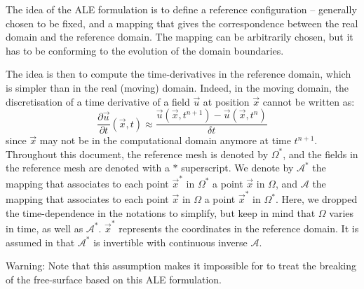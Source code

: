 The idea of the ALE formulation is to define a reference configuration -- generally chosen
to be fixed, and a mapping that gives the correspondence between the real domain and
the reference domain. The mapping can be arbitrarily chosen, but it has to
be conforming to the evolution of the domain boundaries.

The idea is then to compute the time-derivatives in the reference domain,
which is simpler than in the real (moving) domain. Indeed, in the moving domain,
the discretisation of a time derivative of a field $\vec{u}$ at position $\vec{x}$ cannot be written as:
\begin{equation}
\dfrac{\partial \vec{u}}{\partial t}(\vec{x},t) \approx \dfrac{\vec{u}(\vec{x},t^{n+1})-\vec{u}(\vec{x},t^n)}{\delta t}
\end{equation}
since $\vec{x}$ may not be in the computational domain anymore at time $t^{n+1}$.\\

Throughout this document, the reference mesh is denoted by $\Omega^*$, and
the fields in the reference mesh are denoted with a $*$ superscript.
We denote by $\mathcal{A}^*$ the mapping that associates to each point $\vec{x}^*$ in $\Omega^*$ a
point $\vec{x}$ in $\Omega$, and $\mathcal{A}$ the mapping that associates to each point $\vec{x}$ in $\Omega$ a
point $\vec{x}^*$ in $\Omega^*$. Here, we dropped the time-dependence
in the notations to simplify, but keep in mind that $\Omega$ varies in time, as well as $\mathcal{A}^*$.
$\vec{x}^*$ represents the coordinates in the reference domain.
It is assumed in  that $\mathcal{A}^*$ is invertible with continuous inverse $\mathcal{A}$.

\begin{WarningBlock}{Warning:}
Note that this assumption makes it impossible for  to treat the breaking
of the free-surface based on this ALE formulation.
\end{WarningBlock}

